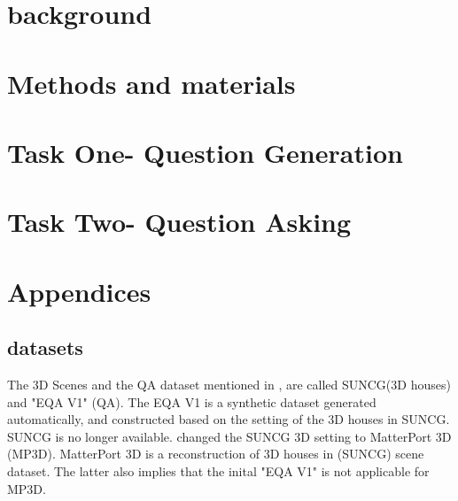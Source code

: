 \documentclass[11pt, a4paper]{article}
\begin{document}



\newpage

\section{background}
\label{sec:background}


\newpage

\section{Methods and materials}
\label{sec:methods}


\newpage

\section{Task One- Question Generation}
\label{sec:task1}



\section{Task Two- Question Asking}
\label{sec:task2}





\newpage
\section{Appendices}


\subsection{datasets} 

The 3D Scenes and the QA dataset mentioned in \cite{embodiedqa}, are called SUNCG(3D houses) and "EQA V1" (QA). The EQA V1 is a synthetic dataset generated automatically, and constructed based on the setting of the 3D houses in SUNCG. SUNCG is no longer available. \cite{embodiedqa} changed the SUNCG 3D setting to MatterPort 3D (MP3D). MatterPort 3D is a reconstruction of 3D houses in (SUNCG) scene dataset. The latter also implies that the inital "EQA V1" is not applicable for MP3D. 
\end{document}
